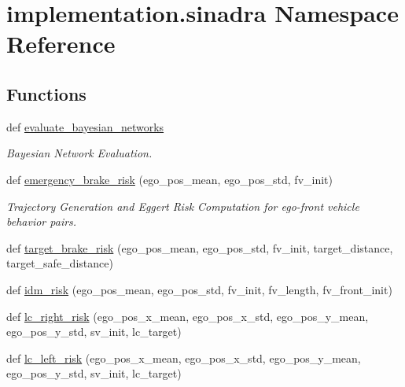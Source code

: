 \hypertarget{namespaceimplementation_1_1sinadra}{}\section{implementation.\+sinadra Namespace Reference}
\label{namespaceimplementation_1_1sinadra}
\subsection*{Functions}
\begin{DoxyCompactItemize}
\item 
def \hyperlink{namespaceimplementation_1_1sinadra_a9c99c51967919cb8364efccda48af70d}{evaluate\+\_\+bayesian\+\_\+networks}
\begin{DoxyCompactList}\small\item\em Bayesian Network Evaluation. \end{DoxyCompactList}\item 
def \hyperlink{namespaceimplementation_1_1sinadra_ad13d5653e8d4562e522ead829bd36b39}{emergency\+\_\+brake\+\_\+risk} (ego\+\_\+pos\+\_\+mean, ego\+\_\+pos\+\_\+std, fv\+\_\+init)
\begin{DoxyCompactList}\small\item\em Trajectory Generation and Eggert Risk Computation for ego-\/front vehicle behavior pairs. \end{DoxyCompactList}\item 
def \hyperlink{namespaceimplementation_1_1sinadra_a84cc54d0f9eef0f6564b6af56315f3d9}{target\+\_\+brake\+\_\+risk} (ego\+\_\+pos\+\_\+mean, ego\+\_\+pos\+\_\+std, fv\+\_\+init, target\+\_\+distance, target\+\_\+safe\+\_\+distance)
\item 
def \hyperlink{namespaceimplementation_1_1sinadra_a28170a6db73e1acb09f5948771730bc4}{idm\+\_\+risk} (ego\+\_\+pos\+\_\+mean, ego\+\_\+pos\+\_\+std, fv\+\_\+init, fv\+\_\+length, fv\+\_\+front\+\_\+init)
\item 
def \hyperlink{namespaceimplementation_1_1sinadra_aefe0dcaa5197d1a117b6d457172c06bd}{lc\+\_\+right\+\_\+risk} (ego\+\_\+pos\+\_\+x\+\_\+mean, ego\+\_\+pos\+\_\+x\+\_\+std, ego\+\_\+pos\+\_\+y\+\_\+mean, ego\+\_\+pos\+\_\+y\+\_\+std, sv\+\_\+init, lc\+\_\+target)
\item 
def \hyperlink{namespaceimplementation_1_1sinadra_a82226ce32c07f60a683f77343f4ebfc4}{lc\+\_\+left\+\_\+risk} (ego\+\_\+pos\+\_\+x\+\_\+mean, ego\+\_\+pos\+\_\+x\+\_\+std, ego\+\_\+pos\+\_\+y\+\_\+mean, ego\+\_\+pos\+\_\+y\+\_\+std, sv\+\_\+init, lc\+\_\+target)

\end{DoxyCompactItemize}
